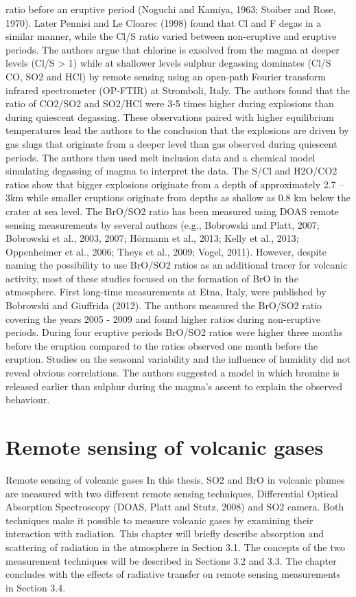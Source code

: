 \documentclass  [
  paper    = a4,
  BCOR     = 10mm,
  twoside,
  fontsize = 12pt,
  fleqn,
  toc      = bibnumbered,
  toc      = listofnumbered,
  numbers  = noendperiod,
  headings = normal,
  listof   = leveldown,
  version  = 3.03
]                                       {scrreprt}
\begin{document}
	ratio before an eruptive period (Noguchi and Kamiya, 1963; Stoiber and Rose,
	1970). Later Pennisi and Le Cloarec (1998) found that Cl and F degas in a
	similar manner, while the Cl/S ratio varied between non-eruptive and eruptive
	periods. The authors argue that chlorine is exsolved from the magma at deeper
	levels (Cl/S > 1) while at shallower levels sulphur degassing dominates (Cl/S
	CO, SO2 and HCl) by remote sensing using an open-path Fourier transform
	infrared spectrometer (OP-FTIR) at Stromboli, Italy. The authors found that
	the ratio of CO2/SO2 and SO2/HCl were 3-5 times higher during explosions than
	during quiescent degassing. These observations paired with higher equilibrium
	temperatures lead the authors to the conclusion that the explosions are driven by
	gas slugs that originate from a deeper level than gas observed during quiescent
	periods. The authors then used melt inclusion data and a chemical model
	simulating degassing of magma to interpret the data. The S/Cl and H2O/CO2
	ratios show that bigger explosions originate from a depth of approximately
	2.7 – 3km while smaller eruptions originate from depths as shallow as 0.8 km
	below the crater at sea level.
	The BrO/SO2 ratio has been measured using DOAS remote sensing measurements
	by several authors (e.g., Bobrowski and Platt, 2007; Bobrowski et al.,
	2003, 2007; Hörmann et al., 2013; Kelly et al., 2013; Oppenheimer et al., 2006;
	Theys et al., 2009; Vogel, 2011). However, despite naming the possibility to
	use BrO/SO2 ratios as an additional tracer for volcanic activity, most of these
	studies focused on the formation of BrO in the atmosphere. First long-time
	measurements at Etna, Italy, were published by Bobrowski and Giuffrida (2012).
	The authors measured the BrO/SO2 ratio covering the years 2005 - 2009 and
	found higher ratios during non-eruptive periods. During four eruptive periods
	BrO/SO2 ratios were higher three months before the eruption compared to the
	ratios observed one month before the eruption. Studies on the seasonal variability
	and the influence of humidity did not reveal obvious correlations. The authors
	suggested a model in which bromine is released earlier than sulphur during the
	magma’s ascent to explain the observed behaviour.
	\section{Remote sensing of volcanic gases}
	Remote sensing of volcanic gases
	In this thesis, SO2 and BrO in volcanic plumes are measured with two different
	remote sensing techniques, Differential Optical Absorption Spectroscopy (DOAS,
	Platt and Stutz, 2008) and SO2 camera. Both techniques make it possible to
	measure volcanic gases by examining their interaction with radiation. This
	chapter will briefly describe absorption and scattering of radiation in the atmosphere
	in Section 3.1. The concepts of the two measurement techniques will
	be described in Sections 3.2 and 3.3. The chapter concludes with the effects of
	radiative transfer on remote sensing measurements in Section 3.4.
\end{document}
